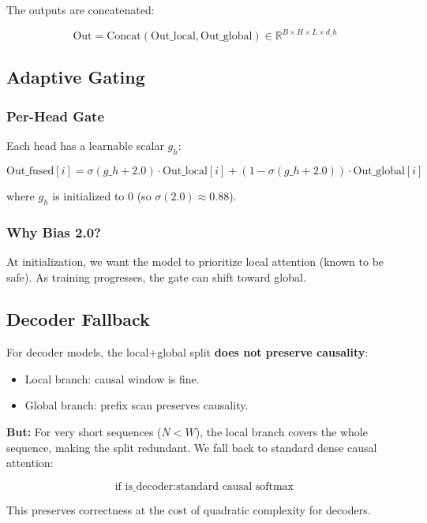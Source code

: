 The outputs are concatenated:

\[
\text{Out} = \text{Concat}(\text{Out}\_\text{local}, \text{Out}\_\text{global}) \in \mathbb{R}^{B \times H \times L \times d\_h}
\]

\subsection{Adaptive Gating}

\subsubsection{Per-Head Gate}

Each head has a learnable scalar $g_h$:

\[
\text{Out}\_\text{fused}[i] = \sigma(g\_h + 2.0) \cdot \text{Out}\_\text{local}[i] + (1 - \sigma(g\_h + 2.0)) \cdot \text{Out}\_\text{global}[i]
\]

where $g_h$ is initialized to 0 (so $\sigma(2.0) \approx 0.88$).

\subsubsection{Why Bias 2.0?}

At initialization, we want the model to prioritize local attention (known 
to be safe). As training progresses, the gate can shift toward global.

\subsection{Decoder Fallback}

For decoder models, the local+global split \textbf{does not preserve causality}:

\begin{itemize}
\item Local branch: causal window is fine.
\item Global branch: prefix scan preserves causality.

\end{itemize}
\textbf{But:} For very short sequences ($N < W$), the local branch covers the 
whole sequence, making the split redundant. We fall back to standard dense 
causal attention:

\[
\text{if } \text{is\_decoder} : \text{standard causal softmax}
\]

This preserves correctness at the cost of quadratic complexity for decoders.

